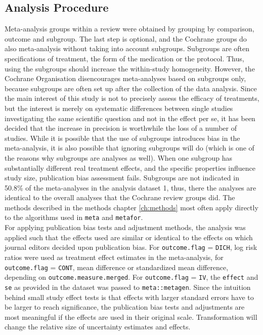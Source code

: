 \documentclass[11pt,a4paper,twoside]{book}\usepackage[]{graphicx}\usepackage[]{color}
\begin{document}
\subsection{Analysis Procedure} \label{sec:procedure}
Meta-analysis groups within a review were obtained by grouping by comparison, outcome and subgroup. The last step is optional, and the Cochrane groups do also meta-analysis without taking into account subgroups. Subgroups are often specifications of treatment, \eg the form of the medication or the protocol. Thus, using the subgroups should increase the within-study homogeneity. However, the Cochrane Organisation disencourages meta-analyses based on subgroups only, because subgroups are often set up after the collection of the data analysis. Since the main interest of this study is not to precisely assess the efficacy of treatments, but the interest is merely on systematic differences between single studies investigating the same scientific question and not in the effect per se, it has been decided that the increase in precision is worthwhile the loss of a number of studies. While it is possible that the use of subgroups introduces bias in the meta-analysis, it is also possible that ignoring subgroups will do (which is one of the reasons why subgroups are analyses as well). When one subgroup has substantially different real treatment effects, and the specific properties influence study size, publication bias assessment fails. Subgroups are not indicated in 50.8\% of the meta-analyses in the analysis dataset 1, thus, there the analyses are identical to the overall analyses that the Cochrane review groups did.
The methods described in the methods chapter \ref{ch:methods} most often apply directly to the algorithms used in \texttt{meta} and \texttt{metafor}. \\
For applying publication bias tests and adjustment methods, the analysis was applied such that the effects used are similar or identical to the effects on which journal editors decided upon publication bias. For \texttt{outcome.flag} = \texttt{DICH}, log risk ratios were used as treatment effect estimates in the meta-analysis, for \texttt{outcome.flag} = \texttt{CONT}, mean difference or standardized mean difference, depending on \texttt{outcome.measure.merged}. For \texttt{outcome.flag} = \texttt{IV}, the \texttt{effect} and \texttt{se} as provided in the dataset was passed to \texttt{meta::metagen}. Since the intuition behind small study effect tests is that effects with larger standard errors have to be larger to reach significance, the publication bias tests and adjustments are most meaningful if the effects are used in their original scale. Transformation will change the relative size of uncertainty estimates and effects.\\ 
\end{document}

